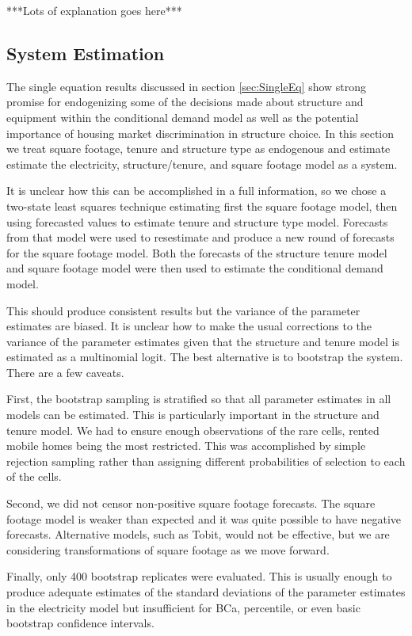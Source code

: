 \documentclass{article}
\begin{document}
***Lots of explanation goes here***




  \subsection{System Estimation}

The single equation results discussed in section \ref{sec:SingleEq} show strong promise for endogenizing some of the decisions made about structure and equipment within the conditional demand model as well as the potential importance of housing market discrimination in structure choice.  In this section we treat square footage, tenure and structure type as endogenous and estimate estimate the electricity, structure/tenure, and square footage model as a system.

It is unclear how this can be accomplished in a full information, so we chose a two-state least squares technique estimating first the square footage model, then using forecasted values to estimate tenure and structure type model.  Forecasts from that model were used to resestimate and produce a new round of forecasts for the square footage model.  Both the forecasts of the structure tenure model and square footage model were then used to estimate the conditional demand model.

This should produce consistent results but the variance of the parameter estimates are biased.  It is unclear how to make the usual corrections to the variance of the parameter estimates given that the structure and tenure model is estimated as a multinomial logit.  The best alternative is to bootstrap the system.  There are a few caveats.

First, the bootstrap sampling is stratified so that all parameter estimates in all models can be estimated.  This is particularly important in the structure and tenure model.  We had to ensure enough observations of the rare cells, rented mobile homes being the most restricted.  This was accomplished by simple rejection sampling rather than assigning different probabilities of selection to each of the cells.

Second, we did not censor non-positive square footage forecasts.  The square footage model is weaker than expected and it was quite possible to have negative forecasts.  Alternative models, such as Tobit, would not be effective, but we are considering transformations of square footage as we move forward.  

Finally, only 400 bootstrap replicates were evaluated.  This is usually enough to produce adequate estimates of the standard deviations of the parameter estimates in the electricity model but insufficient for BCa, percentile, or even basic bootstrap confidence intervals. 
\end{document}
